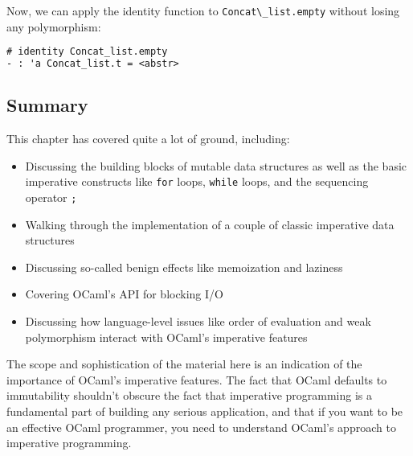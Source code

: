 Now, we can apply the identity function to
\passthrough{\lstinline!Concat\_list.empty!} without losing any
polymorphism:

\begin{lstlisting}[language=Caml]
# identity Concat_list.empty
- : 'a Concat_list.t = <abstr>
\end{lstlisting}

\hypertarget{summary}{%
\subsection{Summary}\label{summary}}

This chapter has covered quite a lot of ground, including:

\begin{itemize}
\item
  Discussing the building blocks of mutable data structures as well as
  the basic imperative constructs like \passthrough{\lstinline!for!}
  loops, \passthrough{\lstinline!while!} loops, and the sequencing
  operator \passthrough{\lstinline!;!}
\item
  Walking through the implementation of a couple of classic imperative
  data structures
\item
  Discussing so-called benign effects like memoization and laziness
\item
  Covering OCaml's API for blocking I/O
\item
  Discussing how language-level issues like order of evaluation and weak
  polymorphism interact with OCaml's imperative features
\end{itemize}

The scope and sophistication of the material here is an indication of
the importance of OCaml's imperative features. The fact that OCaml
defaults to immutability shouldn't obscure the fact that imperative
programming is a fundamental part of building any serious application,
and that if you want to be an effective OCaml programmer, you need to
understand OCaml's approach to imperative programming.~
